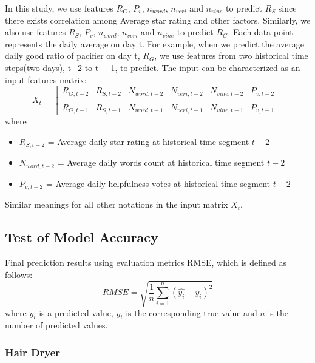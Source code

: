 \documentclass[12pt]{article}
\begin{document}
In this study, we use features $R_{G}$, $P_{v}$, $n_{word}$, $n_{veri}$ and $n_{vine}$ to predict $R_{S}$ since there exists correlation among Average star rating and other factors. Similarly, we also use features $R_{S}$, $P_{v}$, $n_{word}$, $n_{veri}$ and $n_{vine}$ to predict $R_{G}$. Each data point represents the daily average on day t. For example, when we predict the average daily good ratio of pacifier on day t, $R_{G}$, we use features from two historical time steps(two days), t−2 to t − 1, to predict. The input can be characterized as an input features matrix:
\begin{equation*}
X_{t} =\begin{bmatrix}
\textit{$R_{G,t-2}$}&\textit{$R_{S,t-2}$}&\textit{$N_{word,t-2}$}&\textit{$N_{veri,t-2}$}&\textit{$N_{vine,t-2}$}&\textit{$P_{v,t-2}$} \\

&&&&&\\
\textit{$R_{G,t-1}$}&\textit{$R_{S,t-1}$}&\textit{$N_{word,t-1}$}&\textit{$N_{veri,t-1}$}&\textit{$N_{vine,t-1}$}&\textit{$P_{v,t-1}$}

\end{bmatrix}
\end{equation*}
where 
\begin{itemize}
 \item \textit{$R_{S,t-2}$} = Average daily star rating at historical time segment \textit{$t-2$} 
 \item \textit{$N_{word,t-2}$} = Average daily words count at historical time segment \textit{$t-2$} 
 \item $P_{v,t-2}$ = Average daily helpfulness votes at historical time segment \textit{$t-2$}
\end{itemize} 
Similar meanings for all other notations in the input matrix $X_{t}$.

\subsection{Test of Model Accuracy}
Final prediction results using evaluation metrics RMSE, which is defined as follows:
\begin{equation}
    RMSE = \sqrt{\frac{1}{n}\sum_{i = 1}^{n}(\hat{y_{i}} - y_{i})^{2}}
\label{RMSE}
\end{equation}
where $\hat{y_i}$ is a predicted value, $y_i$ is the corresponding true value and $n$ is the number of predicted values.

\subsubsection{Hair Dryer}
\end{document}
